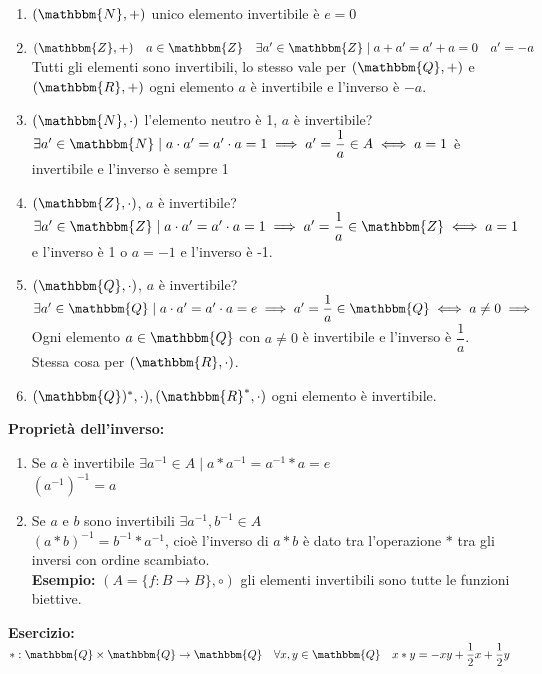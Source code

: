 \documentclass[12pt, letterpaper]{report}
\begin{document}
		\begin{enumerate}
			\item $(\mathbbm{N}, +)$ unico elemento invertibile è $e=0$
			\item $(\mathbbm{Z}, +) \quad a \in \mathbbm{Z} \quad \exists a' \in \mathbbm{Z} \mid a + a' = a' + a = 0 \quad a'=-a$ \\
			Tutti gli elementi sono invertibili, lo stesso vale per $(\mathbbm{Q}, +)$ e $(\mathbbm{R}, +)$ ogni elemento $a$ è invertibile e l'inverso è $-a$.
			\item $(\mathbbm{N}, \cdot)$ l'elemento neutro è 1, $a$ è invertibile? \\
			$\exists a' \in \mathbbm{N} \mid a \cdot a' = a' \cdot a = 1 \implies a' = \dfrac{1}{a} \in A \iff a=1$ è invertibile e l'inverso è sempre 1
			\item $(\mathbbm{Z}, \cdot)$, $a$ è invertibile? \\
			$\exists a' \in \mathbbm{Z} \mid a \cdot a' = a' \cdot a = 1 \implies a' = \dfrac{1}{a} \in \mathbbm{Z} \iff a=1$ e l'inverso è 1 o $a=-1$ e l'inverso è -1.
			\item $(\mathbbm{Q}, \cdot)$, $a$ è invertibile? \\
			$\exists a' \in \mathbbm{Q} \mid  a \cdot a' = a' \cdot a = e \implies a' = \dfrac{1}{a} \in \mathbbm{Q} \iff a \neq 0 \implies$ Ogni elemento $a \in \mathbbm{Q}$ con $a \neq 0$ è invertibile e l'inverso è $\dfrac{1}{a}$. \\
			Stessa cosa per $(\mathbbm{R}, \cdot)$.
			\item $(\mathbbm{Q})^*, \cdot), (\mathbbm{R}^*, \cdot)$ ogni elemento è invertibile.
		\end{enumerate}
		\textbf{Proprietà dell'inverso:}
		\begin{enumerate}
			\item Se $a$ è invertibile $\exists a^{-1} \in A \mid a * a^{-1} = a^{-1} * a = e$ \\
			$(a^{-1})^{-1} = a$
			\item Se $a$ e $b$ sono invertibili $\exists a^{-1}, b^{-1} \in A$ \\
			$(a*b)^{-1} = b^{-1} * a^{-1}$, cioè l'inverso di $a*b$ è dato tra l'operazione $*$ tra gli inversi con ordine scambiato. \\
			\textbf{Esempio:} $(A = \{f: B \to B\}, \circ)$ gli elementi invertibili sono tutte le funzioni biettive. \\
		\end{enumerate}
					\textbf{Esercizio:} $*: \mathbbm{Q} \times \mathbbm{Q} \to \mathbbm{Q} \quad \forall x,y \in \mathbbm{Q} \quad  x * y = -xy + \dfrac{1}{2}x + \dfrac{1}{2}y$ \\
\end{document}
